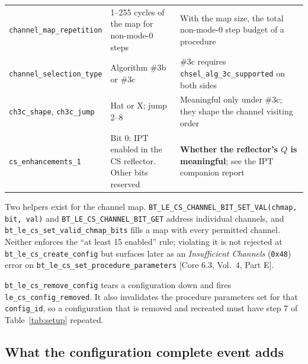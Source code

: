 \documentclass[11pt,a4paper]{article}
\newcommand{\code}[1]{\texttt{\small #1}}
\newcommand{\IPT}{\ensuremath{\mathrm{IPT}}}
\newcommand{\core}[1]{\textcolor{rulegrey}{\small[Core 6.3, #1]}}
\begin{document}
\begin{table}[htb]
\begin{tabular}{@{}L{40mm}L{46mm}L{48mm}@{}}
\code{channel\_\allowbreak{}map\_\allowbreak{}repetition} & 1--255 cycles of the map for non-mode-0 steps & With the map size, the total non-mode-0 step budget of a procedure \\
\code{channel\_\allowbreak{}selection\_\allowbreak{}type} & Algorithm \#3b or \#3c & \#3c requires \code{chsel\_\allowbreak{}alg\_\allowbreak{}3c\_\allowbreak{}supported} on both sides \\
\code{ch3c\_\allowbreak{}shape}, \code{ch3c\_\allowbreak{}jump} & Hat or X; jump 2--8 & Meaningful only under \#3c; they shape the channel visiting order \\
\code{cs\_\allowbreak{}enhancements\_\allowbreak{}1} & Bit 0: \IPT{} enabled in the CS reflector. Other bits reserved & \textbf{Whether the reflector's $Q$ is meaningful}; see the \IPT{} companion report \\
\bottomrule
\end{tabular}
\end{table}

Two helpers exist for the channel map. \code{BT\_\allowbreak{}LE\_\allowbreak{}CS\_\allowbreak{}CHANNEL\_\allowbreak{}BIT\_\allowbreak{}SET\_\allowbreak{}VAL(chmap, bit,
val)} and \code{BT\_\allowbreak{}LE\_\allowbreak{}CS\_\allowbreak{}CHANNEL\_\allowbreak{}BIT\_\allowbreak{}GET} address individual channels, and
\code{bt\_\allowbreak{}le\_\allowbreak{}cs\_\allowbreak{}set\_\allowbreak{}valid\_\allowbreak{}chmap\_\allowbreak{}bits} fills a map with every permitted channel. Neither
enforces the ``at least 15 enabled'' rule; violating it is not rejected at
\code{bt\_\allowbreak{}le\_\allowbreak{}cs\_\allowbreak{}create\_\allowbreak{}config} but surfaces later as an
\emph{Insufficient Channels} (\code{0x48}) error on
\code{bt\_\allowbreak{}le\_\allowbreak{}cs\_\allowbreak{}set\_\allowbreak{}procedure\_\allowbreak{}parameters} \core{Vol.\ 4, Part E}.

\code{bt\_\allowbreak{}le\_\allowbreak{}cs\_\allowbreak{}remove\_\allowbreak{}config} tears a configuration down and fires
\code{le\_\allowbreak{}cs\_\allowbreak{}config\_\allowbreak{}removed}. It also invalidates the procedure parameters set for that
\code{config\_\allowbreak{}id}, so a configuration that is removed and recreated must have step 7 of
Table~\ref{tab:setup} repeated.

\subsection{What the configuration complete event adds}
\label{sec:cfgtimes}
\end{document}
